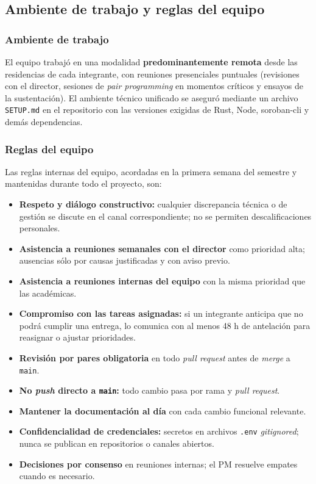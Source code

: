 \documentclass[12pt,oneside]{report}
\begin{document}
    \subsection{Ambiente de trabajo y reglas del equipo}
    \label{subsec:ambiente-equipo}

      \subsubsection{Ambiente de trabajo}
      El equipo trabajó en una modalidad \textbf{predominantemente remota} desde las residencias de cada integrante, con reuniones presenciales puntuales (revisiones con el director, sesiones de \textit{pair programming} en momentos críticos y ensayos de la sustentación). El ambiente técnico unificado se aseguró mediante un archivo \texttt{SETUP.md} en el repositorio con las versiones exigidas de Rust, Node, soroban-cli y demás dependencias.

      \subsubsection{Reglas del equipo}
      Las reglas internas del equipo, acordadas en la primera semana del semestre y mantenidas durante todo el proyecto, son:
      \begin{itemize}
        \item \textbf{Respeto y diálogo constructivo:} cualquier discrepancia técnica o de gestión se discute en el canal correspondiente; no se permiten descalificaciones personales.
        \item \textbf{Asistencia a reuniones semanales con el director} como prioridad alta; ausencias sólo por causas justificadas y con aviso previo.
        \item \textbf{Asistencia a reuniones internas del equipo} con la misma prioridad que las académicas.
        \item \textbf{Compromiso con las tareas asignadas:} si un integrante anticipa que no podrá cumplir una entrega, lo comunica con al menos 48 h de antelación para reasignar o ajustar prioridades.
        \item \textbf{Revisión por pares obligatoria} en todo \textit{pull request} antes de \textit{merge} a \texttt{main}.
        \item \textbf{No \textit{push} directo a \texttt{main}:} todo cambio pasa por rama y \textit{pull request}.
        \item \textbf{Mantener la documentación al día} con cada cambio funcional relevante.
        \item \textbf{Confidencialidad de credenciales:} secretos en archivos \texttt{.env} \textit{gitignored}; nunca se publican en repositorios o canales abiertos.
        \item \textbf{Decisiones por consenso} en reuniones internas; el PM resuelve empates cuando es necesario.
      \end{itemize}
\end{document}
